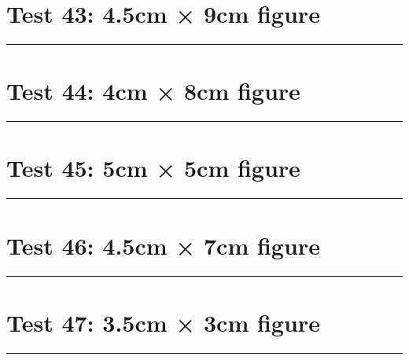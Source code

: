 \documentclass[a4paper,11pt]{article}
\begin{document}
\section*{Test 43: 4.5cm × 9cm figure}
\begin{swarmwrap}%
  \begin{minipage}[t]{4cm}
    \centering
    \rule{\linewidth}{9cm}
  \end{minipage}%
\end{swarmwrap}%
\swarmwrapnext
\lipsum[69]
\lipsum[70]
\lipsum[71]
\lipsum[72]
\section*{Test 44: 4cm × 8cm figure}
\begin{swarmwrap}%
  \begin{minipage}[t]{4cm}
    \centering
    \rule{\linewidth}{8cm}
  \end{minipage}%
\end{swarmwrap}%
\swarmwrapnext
\lipsum[140]
\lipsum[141]
\lipsum[142]
\lipsum[143]
\section*{Test 45: 5cm × 5cm figure}
\begin{swarmwrap}%
  \begin{minipage}[t]{5cm}
    \centering
    \rule{\linewidth}{5cm}
  \end{minipage}%
\end{swarmwrap}%
\swarmwrapnext
\lipsum[104]
\lipsum[105]
\lipsum[106]
\lipsum[107]
\lipsum[108]
\section*{Test 46: 4.5cm × 7cm figure}
\begin{swarmwrap}%
  \begin{minipage}[t]{4cm}
    \centering
    \rule{\linewidth}{7cm}
  \end{minipage}%
\end{swarmwrap}%
\swarmwrapnext
\lipsum[134]
\lipsum[135]
\lipsum[136]
\lipsum[137]
\lipsum[138]
\lipsum[139]
\section*{Test 47: 3.5cm × 3cm figure}
\begin{swarmwrap}%
  \begin{minipage}[t]{3cm}
    \centering
    \rule{\linewidth}{3cm}
  \end{minipage}%
\end{swarmwrap}%
\swarmwrapnext
\lipsum[59]
\lipsum[60]
\lipsum[61]
\lipsum[62]
\end{document}
